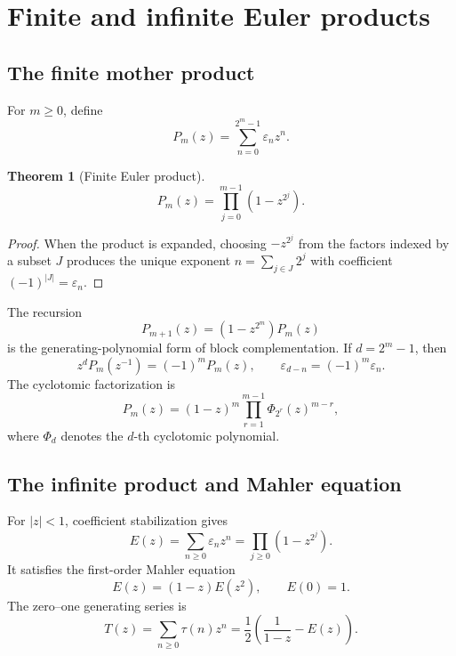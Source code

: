\documentclass[11pt,oneside]{article}
\numberwithin{equation}{section}
\newtheorem{theorem}{Theorem}[section]
\theoremstyle{definition}
\theoremstyle{remark}
\newcommand{\eps}{\varepsilon}
\newcommand{\TM}{\tau}
\begin{document}
\section{Finite and infinite Euler products}
\label{sec:products}

\subsection{The finite mother product}

For \(m\ge0\), define
\begin{equation}
 P_m(z)=\sum_{n=0}^{2^m-1}\eps_nz^n.
 \label{eq:Pm-def}
\end{equation}

\begin{theorem}[Finite Euler product]
\begin{equation}
 \boxed{P_m(z)=\prod_{j=0}^{m-1}(1-z^{2^j}).}
 \label{eq:finite-product}
\end{equation}
\end{theorem}

\begin{proof}
When the product is expanded, choosing \(-z^{2^j}\) from the factors indexed
by a subset \(J\) produces the unique exponent
\(n=\sum_{j\in J}2^j\) with coefficient \((-1)^{|J|}=\eps_n\).
\end{proof}

The recursion
\begin{equation}
 P_{m+1}(z)=(1-z^{2^m})P_m(z)
 \label{eq:Pm-recursion}
\end{equation}
is the generating-polynomial form of block complementation.  If
\(d=2^m-1\), then
\begin{equation}
 z^dP_m(z^{-1})=(-1)^mP_m(z),
 \qquad
 \eps_{d-n}=(-1)^m\eps_n.
 \label{eq:Pm-reciprocity}
\end{equation}
The cyclotomic factorization is
\begin{equation}
 P_m(z)=(1-z)^m\prod_{r=1}^{m-1}\Phi_{2^r}(z)^{m-r},
 \label{eq:cyclotomic-Pm}
\end{equation}
where \(\Phi_d\) denotes the \(d\)-th cyclotomic polynomial.

\subsection{The infinite product and Mahler equation}

For \(|z|<1\), coefficient stabilization gives
\begin{equation}
 \boxed{E(z)=\sum_{n\ge0}\eps_nz^n
 =\prod_{j\ge0}(1-z^{2^j}).}
 \label{eq:E-product}
\end{equation}
It satisfies the first-order Mahler equation
\begin{equation}
 \boxed{E(z)=(1-z)E(z^2),\qquad E(0)=1.}
 \label{eq:E-mahler}
\end{equation}
The zero--one generating series is
\begin{equation}
 T(z)=\sum_{n\ge0}\TM(n)z^n
 =\frac12\left(\frac1{1-z}-E(z)\right).
 \label{eq:T-from-E}
\end{equation}
\end{document}
